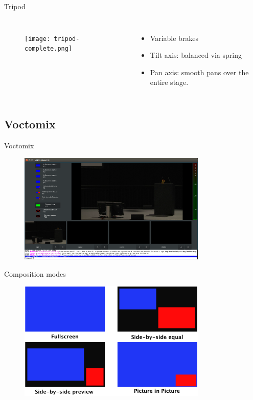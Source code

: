 \documentclass[hyperref={pdfpagelabels=false},aspectratio=169]{beamer}
\begin{document}
\begin{frame}{Tripod}
	\begin{columns}[T,onlytextwidth]
	\begin{figure} 
		\centering
		\texttt{[image: tripod-complete.png]}
	\end{figure}
	\begin{itemize}
	\item Variable brakes
 	\item Tilt axis: balanced via spring
 	\item Pan axis: smooth pans over the entire stage.
		\end{itemize}
	\end{columns}
\end{frame}

\subsection{Voctomix} %
\begin{frame}{Voctomix}
	\begin{figure} 
		\centering
		\includegraphics[width=0.8\textwidth]{voctomix.png}
	\end{figure}
\end{frame}

\begin{frame}{Composition modes}
	\begin{figure} 
		\centering
		\includegraphics[width=0.8\textwidth]{composition_modes.png}
	\end{figure}
\end{frame}
\end{document}
